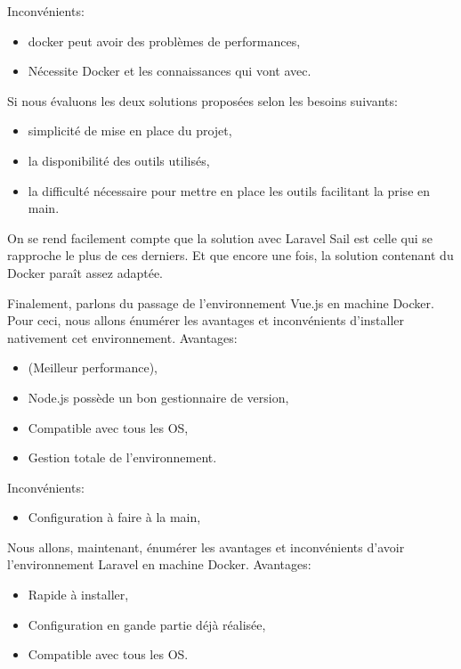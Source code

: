 \documentclass[
    iai, %
    il, %
]{heig-tb}
\begin{document}
Inconvénients:
\begin{itemize}
    \item \Gls{docker} peut avoir des problèmes de performances, \cite{labrecque}
    \item Nécessite Docker et les connaissances qui vont avec. \cite{labrecque}
\end{itemize}

Si nous évaluons les deux solutions proposées selon les besoins suivants:
\begin{itemize}
    \item simplicité de mise en place du projet,
    \item la disponibilité des outils utilisés,
    \item la difficulté nécessaire pour mettre en place les outils facilitant la prise en main.
\end{itemize}

On se rend facilement compte que la solution avec Laravel Sail est celle qui se rapproche le plus de ces derniers. Et que encore une fois, la solution contenant du Docker paraît assez adaptée.


Finalement, parlons du passage de l'environnement Vue.js en machine Docker.
Pour ceci, nous allons énumérer les avantages et inconvénients d'installer nativement cet environnement.
Avantages:
\begin{itemize}
    \item (Meilleur performance),
    \item Node.js possède un bon gestionnaire de version,
    \item Compatible avec tous les OS,
    \item Gestion totale de l'environnement.
\end{itemize}

Inconvénients:
\begin{itemize}
    \item Configuration à faire à la main,
\end{itemize}

Nous allons, maintenant, énumérer les avantages et inconvénients d'avoir l'environnement Laravel en machine Docker.
Avantages:
\begin{itemize}
    \item Rapide à installer,
    \item Configuration en gande partie déjà réalisée,
    \item Compatible avec tous les OS.
\end{itemize}
\end{document}
